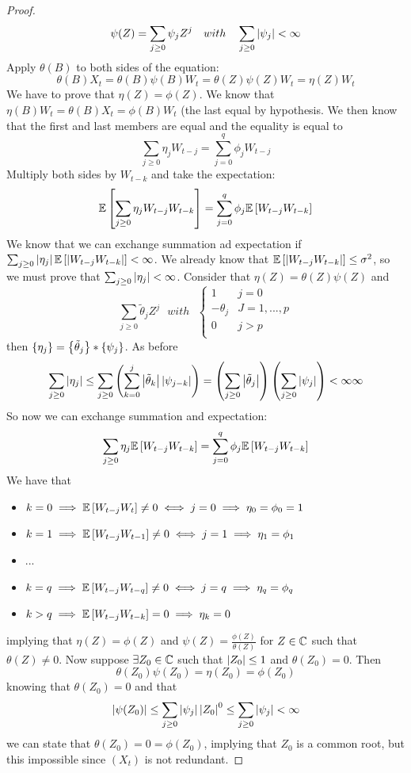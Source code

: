 \begin{proof}
    \[
        \psi(Z)=\sum_{j\ge0}\psi_jZ^j\ \ \ with\ \ \ \sum_{j\ge0}\abs{\psi_j}<\infty
    \]
    Apply $\theta(B)$ to both sides of the equation:
    \[
        \theta(B)X_t=\theta(B)\psi(B)W_t=\theta(Z)\psi(Z)W_t=\eta(Z)W_t
    \]
    We have to prove that $\eta(Z)=\phi(Z)$. We know that $\eta(B)W_t=\theta(B)X_t=\phi(B)W_t$ (the last equal by hypothesis. We then know that the first and last members are equal and the equality is equal to
    \[
        \sum_{j\ge0}\eta_jW_{t-j}=\sum_{j=0}^q\phi_jW_{t-j}  
    \]
    Multiply both sides by $W_{t-k}$ and take the expectation:
    \[
        \mathbb{E}\left[\sum_{j\ge0}\eta_jW_{t-j}W_{t-k}\right]=\sum_{j=0}^q\phi_j\mathbb{E}\left[W_{t-j}W_{t-k}\right] 
    \]
    We know that we can exchange summation ad expectation if $\sum_{j\ge0}\left|\eta_j\right|\mathbb{E}\left[\left|W_{t-j}W_{t-k}\right|\right]<\infty$. We already know that $\mathbb{E}\left[\left|W_{t-j}W_{t-k}\right|\right]\le\sigma^2$, so we must prove that $\sum_{j\ge0}\left|\eta_j\right|<\infty$. Consider that $\eta(Z)=\theta(Z)\psi(Z)$ and
    \[
        \sum_{j\ge0}\tilde{\theta}_jZ^j\ \ \ with\ \ \ 
        \begin{cases}
            1&j=0\\
            -\theta_j&J=1,...,p\\
            0&j>p\\
        \end{cases}
    \]
    then $\left\{\eta_j\right\}=\left\{\tilde{\theta}_j\right\}*\left\{\psi_j\right\}$. As before
    \[
        \sum_{j\ge0}\left|\eta_j\right|\le\sum_{j\ge0}\left(\sum_{k=0}^j\left|\tilde{\theta}_k\right|\left|\psi_{j-k}\right|\right)=\left(\sum_{j\ge0}\left|\tilde{\theta}_j\right|\right)\left(\sum_{j\ge0}\left|\psi_j\right|\right)<\infty\infty
    \]
    So now we can exchange summation and expectation:
    \[
        \sum_{j\ge0}\eta_j\mathbb{E}\left[W_{t-j}W_{t-k}\right]=\sum_{j=0}^q\phi_j\mathbb{E}\left[W_{t-j}W_{t-k}\right]
    \]
    We have that
    \begin{itemize}
        \item $k=0\implies\mathbb{E}\left[W_{t-j}W_t\right]\ne0\iff j=0\implies\eta_0=\phi_0=1$
        \item $k=1\implies\mathbb{E}\left[W_{t-j}W_{t-1}\right]\ne0\iff j=1\implies\eta_1=\phi_1$
        \item ...
        \item $k=q\implies\mathbb{E}\left[W_{t-j}W_{t-q}\right]\ne0\iff j=q\implies\eta_q=\phi_q$
        \item $k>q\implies\mathbb{E}\left[W_{t-j}W_{t-k}\right]=0\implies\eta_k=0$
    \end{itemize}
    implying that $\eta(Z)=\phi(Z)$ and $\psi(Z)=\frac{\phi(Z)}{\theta(Z)}$ for $Z\in\mathbb{C}$ such that $\theta(Z)\ne0$. Now suppose $\exists Z_0\in\mathbb{C}$ such that $\left|Z_0\right|\le1$ and $\theta(Z_0)=0$. Then
    \[
        \theta(Z_0)\psi(Z_0)=\eta(Z_0)=\phi(Z_0)  
    \]
    knowing that $\theta(Z_0)=0$ and that
    \[
        \left|\psi(Z_0)\right|\le\sum_{j\ge0}\left|\psi_j\right|\left|Z_0\right|^0\le\sum_{j\ge0}\left|\psi_j\right|<\infty
    \]
    we can state that $\theta(Z_0)=0=\phi(Z_0)$, implying that $Z_0$ is a common root, but this impossible since $(X_t)$ is not redundant.
\end{proof}


